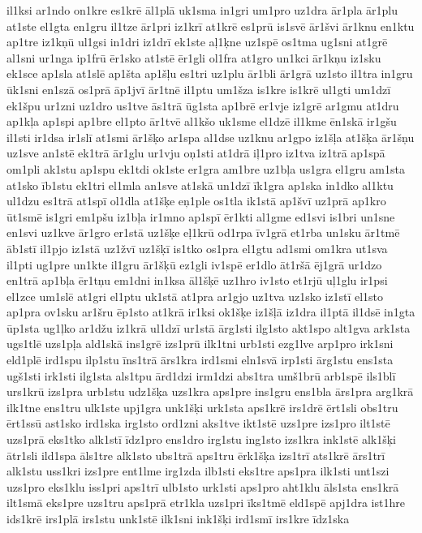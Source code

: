 {il1ksi
ar1ndo
on1kre
es1krē
āl1plā
uk1sma
in1gri
um1pro
uz1dra
ār1pla
ār1plu
at1ste
el1gta
en1gru
il1tze
ār1pri
iz1krī
at1krē
es1prū
is1svē
ār1švi
ār1knu
en1ktu
ap1tre
iz1kņū
ul1gsi
in1dri
iz1drī
ek1ste
aļ1ķne
uz1spē
os1tma
ug1sni
at1grē
al1sni
ur1nga
ip1frū
ēr1sko
at1stē
ēr1gli
ol1fra
at1gro
un1kci
ār1kņu
iz1sku
ek1sce
ap1sla
at1slē
ap1šta
ap1šļu
es1tri
uz1plu
ār1bli
ār1grā
uz1sto
il1tra
in1gru
ūk1sni
en1szā
os1prā
āp1jvī
ār1tnē
il1ptu
um1šza
is1kre
is1krē
ul1gti
um1dzī
ek1špu
ur1zni
uz1dro
us1tve
ās1trā
ūg1sta
ap1brē
er1vje
iz1grē
ar1gmu
at1dru
ap1kļa
ap1spi
ap1bre
el1pto
ār1tvē
al1kšo
uk1sme
el1dzē
il1kme
ēn1skā
ir1gšu
il1sti
ir1dsa
ir1slī
at1smi
ār1šķo
ar1spa
al1dse
uz1knu
ar1gpo
iz1šļa
at1šķa
ār1šņu
uz1sve
an1stē
ek1trā
ār1glu
ur1vju
oņ1sti
at1drā
iļ1pro
iz1tva
iz1trā
ap1spā
om1pli
ak1stu
ap1spu
ek1tdi
ok1ste
er1gra
am1bre
uz1bļa
us1gra
el1gru
am1sta
at1sko
īb1stu
ek1tri
el1mla
an1sve
at1skā
un1dzī
īk1gra
ap1ska
in1dko
al1ktu
ul1dzu
es1trā
at1spī
ol1dla
at1šķe
eņ1ple
os1tla
ik1stā
ap1švī
uz1prā
ap1kro
ūt1smē
is1gri
em1pšu
iz1bļa
ir1mno
ap1spī
ēr1kti
al1gme
ed1svi
is1bri
un1sne
en1svi
uz1kve
ār1gro
er1stā
uz1šķe
eļ1krū
od1rpa
īv1grā
et1rba
un1sku
ār1tmē
āb1stī
il1pjo
iz1stā
uz1žvī
uz1šķī
is1tko
os1pra
el1gtu
ad1smi
om1kra
ut1sva
il1pti
ug1pre
un1kte
il1gru
ār1šķū
ez1gli
iv1spē
er1dlo
āt1ršā
ēj1grā
ur1dzo
en1trā
ap1bļa
ēr1tņu
em1dni
in1ksa
āl1šķē
uz1hro
iv1sto
et1rjū
uļ1glu
ir1psi
el1zce
um1slē
at1gri
el1ptu
uk1stā
at1pra
ar1gjo
uz1tva
uz1sko
iz1stī
el1sto
ap1pra
ov1sku
ar1šru
ēp1sto
at1krā
ir1ksi
ok1šķe
iz1šļā
iz1dra
il1ptā
il1dsē
in1gta
ūp1sta
ug1ļko
ar1džu
iz1krā
ul1dzī
ur1stā
ārg1sti
ilg1sto
akt1spo
alt1gva
ark1sta
ugs1tlē
uzs1pļa
ald1skā
ins1grē
izs1prū
ilk1tni
urb1sti
ezg1lve
arp1pro
irk1sni
eld1plē
ird1spu
ilp1stu
īns1trā
ārs1kra
ird1smi
eln1svā
irp1sti
ārg1stu
ens1sta
ugš1sti
irk1sti
ilg1sta
als1tpu
ārd1dzi
irm1dzi
abs1tra
umš1brū
arb1spē
ils1blī
urs1krū
izs1pra
urb1stu
udz1šķa
uzs1kra
aps1pre
ins1gru
ens1bla
ārs1pra
arg1krā
ilk1tne
ens1tru
ulk1ste
upj1gra
unk1šķi
urk1sta
aps1krē
irs1drē
ērt1sli
obs1tru
ērt1ssū
ast1sko
ird1ska
irg1sto
ord1zni
aks1tve
ikt1stē
uzs1pre
izs1pro
ilt1stē
uzs1prā
eks1tko
alk1stī
īdz1pro
ens1dro
irg1stu
ing1sto
izs1kra
ink1stē
alk1šķi
ātr1sli
ild1spa
āls1tre
alk1sto
ubs1trā
aps1tru
ērk1šķa
izs1trī
ats1krē
ārs1trī
alk1stu
uss1kri
izs1pre
ent1lme
irg1zda
ilb1sti
eks1tre
aps1pra
ilk1sti
unt1szi
uzs1pro
eks1klu
iss1pri
aps1trī
ulb1sto
urk1sti
aps1pro
aht1klu
āls1sta
ens1krā
ilt1smā
eks1pre
uzs1tru
aps1prā
etr1kla
uzs1pri
īks1tmē
eld1spē
apj1dra
ist1hre
ids1krē
irs1plā
irs1stu
unk1stē
ilk1sni
ink1šķi
ird1smī
irs1kre
īdz1ska
}
